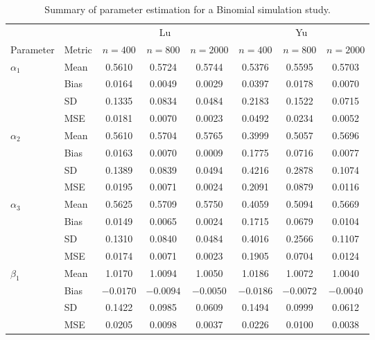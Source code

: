 \begin{table}[ht!]
\centering
\begin{threeparttable}
\caption{Summary of parameter estimation for a Binomial simulation study.}
\label{tab:sim_param_bino_extended}
\begin{tabular}{llcccccc}
\toprule
& & \multicolumn{3}{c}{Lu} & \multicolumn{3}{c}{Yu} \\
\cmidrule(lr){3-5} \cmidrule(lr){6-8}
Parameter & Metric 
& $n=400$ & $n=800$ & $n=2000$
& $n=400$ & $n=800$ & $n=2000$ \\
\midrule

\multirow{4}{*}{$\alpha_{1}$}
& Mean & 0.5610 & 0.5724 & 0.5744 & 0.5376 & 0.5595 & 0.5703 \\
& Bias & 0.0164 & 0.0049 & 0.0029 & 0.0397 & 0.0178 & 0.0070 \\
& SD   & 0.1335 & 0.0834 & 0.0484 & 0.2183 & 0.1522 & 0.0715 \\
& MSE  & 0.0181 & 0.0070 & 0.0023 & 0.0492 & 0.0234 & 0.0052 \\
\midrule

\multirow{4}{*}{$\alpha_{2}$}
& Mean & 0.5610 & 0.5704 & 0.5765 & 0.3999 & 0.5057 & 0.5696 \\
& Bias & 0.0163 & 0.0070 & 0.0009 & 0.1775 & 0.0716 & 0.0077 \\
& SD   & 0.1389 & 0.0839 & 0.0494 & 0.4216 & 0.2878 & 0.1074 \\
& MSE  & 0.0195 & 0.0071 & 0.0024 & 0.2091 & 0.0879 & 0.0116 \\
\midrule

\multirow{4}{*}{$\alpha_{3}$}
& Mean & 0.5625 & 0.5709 & 0.5750 & 0.4059 & 0.5094 & 0.5669 \\
& Bias & 0.0149 & 0.0065 & 0.0024 & 0.1715 & 0.0679 & 0.0104 \\
& SD   & 0.1310 & 0.0840 & 0.0484 & 0.4016 & 0.2566 & 0.1107 \\
& MSE  & 0.0174 & 0.0071 & 0.0023 & 0.1905 & 0.0704 & 0.0124 \\
\midrule

\multirow{4}{*}{$\beta_{1}$}
& Mean & 1.0170 & 1.0094 & 1.0050 & 1.0186 & 1.0072 & 1.0040 \\
& Bias & $-0.0170$ & $-0.0094$ & $-0.0050$ & $-0.0186$ & $-0.0072$ & $-0.0040$ \\
& SD   & 0.1422 & 0.0985 & 0.0609 & 0.1494 & 0.0999 & 0.0612 \\
& MSE  & 0.0205 & 0.0098 & 0.0037 & 0.0226 & 0.0100 & 0.0038 \\
\midrule


\end{tabular}
\end{threeparttable}
\end{table}
